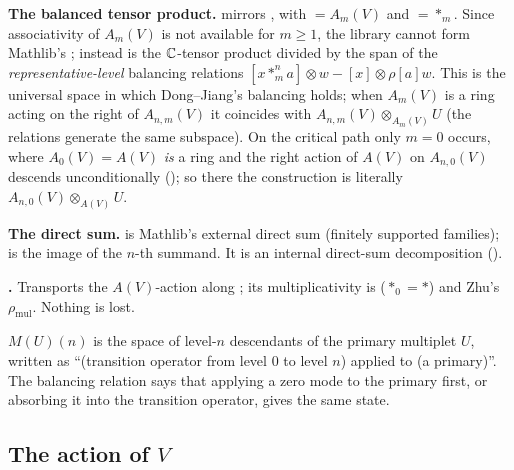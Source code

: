 \begin{dictionary}
\textbf{The balanced tensor product.}  mirrors , with  $= A_m(V)$ and
 $=*_m$. Since associativity of $A_m(V)$ is not available for $m\ge1$, the library cannot form Mathlib's
; instead  is the ${\mathbb{C}}$-tensor product divided by the span of the
\emph{representative-level} balancing relations $[x*^n_ma]\otimes w - [x]\otimes\rho[a]w$. This is the universal space in which
Dong--Jiang's balancing holds; when $A_m(V)$ is a ring acting on the right of $A_{n,m}(V)$ it coincides with
$A_{n,m}(V)\otimes_{A_m(V)}U$ (the relations generate the same subspace). On the critical path only $m = 0$ occurs, where
$A_0(V) = A(V)$ \emph{is} a ring and the right action of $A(V)$ on $A_{n,0}(V)$ descends unconditionally
(); so there the construction is literally $A_{n,0}(V)\otimes_{A(V)}U$.

\textbf{The direct sum.}  is Mathlib's external direct sum (finitely supported families);
 is the image of the $n$-th summand. It is an internal direct-sum decomposition
().

\textbf{.} Transports the $A(V)$-action along ; its
multiplicativity is  ($*_0 = *$) and Zhu's $\rho_{\mathrm{mul}}$. Nothing is lost.
\end{dictionary}

\begin{physics}
$M(U)(n)$ is the space of level-$n$ descendants of the primary multiplet $U$, written as ``(transition operator from level $0$
to level $n$) applied to (a primary)''. The balancing relation says that applying a zero mode to the primary first, or
absorbing it into the transition operator, gives the same state.
\end{physics}

\subsection{The action of \texorpdfstring{$V$}{V}}

